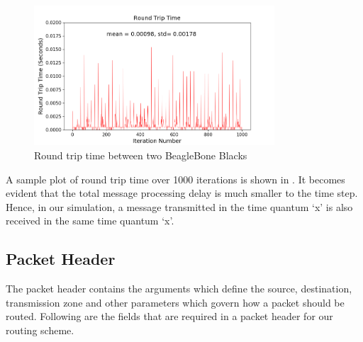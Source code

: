 \begin{figure}[hbtp]
\centering
\includegraphics[width=0.8\textwidth]{Chapter-4/figs/transmission_time}
\caption{Round trip time between two BeagleBone Blacks}
\label{fig:proc_delay_graph}
\end{figure}

A sample plot of round trip time over 1000 iterations is shown in . It becomes evident that the total message processing delay is much smaller to the time step. Hence, in our simulation, a message transmitted in the time quantum `x' is also received in the same time quantum `x'.

\subsection{Packet Header} \label{packet_header}
The packet header contains the arguments which define the source, destination, transmission zone and other parameters which govern how a packet should be routed. Following are the fields that are required in a packet header for our routing scheme.


